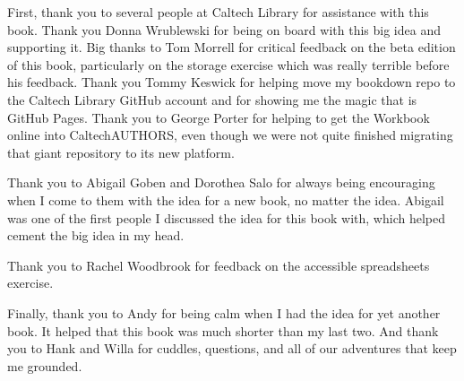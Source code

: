 \documentclass[
]{book}
\begin{document}
First, thank you to several people at Caltech Library for assistance with this book. Thank you Donna Wrublewski for being on board with this big idea and supporting it. Big thanks to Tom Morrell for critical feedback on the beta edition of this book, particularly on the storage exercise which was really terrible before his feedback. Thank you Tommy Keswick for helping move my bookdown repo to the Caltech Library GitHub account and for showing me the magic that is GitHub Pages. Thank you to George Porter for helping to get the Workbook online into CaltechAUTHORS, even though we were not quite finished migrating that giant repository to its new platform.

Thank you to Abigail Goben and Dorothea Salo for always being encouraging when I come to them with the idea for a new book, no matter the idea. Abigail was one of the first people I discussed the idea for this book with, which helped cement the big idea in my head.

Thank you to Rachel Woodbrook for feedback on the accessible spreadsheets exercise.

Finally, thank you to Andy for being calm when I had the idea for yet another book. It helped that this book was much shorter than my last two. And thank you to Hank and Willa for cuddles, questions, and all of our adventures that keep me grounded.

  
\end{document}
